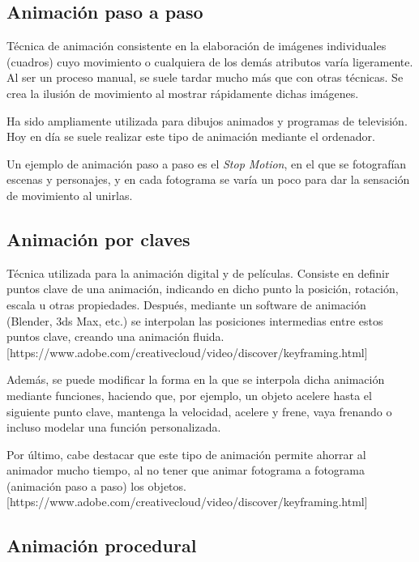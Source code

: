 \documentclass{article}
\begin{document}
\subsection{Animación paso a paso}

Técnica de animación consistente en la elaboración de imágenes individuales (cuadros) cuyo movimiento o cualquiera de los demás atributos varía ligeramente. Al ser un proceso manual, se suele tardar mucho más que con otras técnicas. Se crea la ilusión de movimiento al mostrar rápidamente dichas imágenes. 

\bigskip

Ha sido ampliamente utilizada para dibujos animados y programas de televisión. Hoy en día se suele realizar este tipo de animación mediante el ordenador. 

\bigskip

Un ejemplo de animación paso a paso es el \textit{Stop Motion}, en el que se fotografían escenas y personajes, y en cada fotograma se varía un poco para dar la sensación de movimiento al unirlas.


\subsection{Animación por claves}

Técnica utilizada para la animación digital y de películas. Consiste en definir puntos clave de una animación, indicando en dicho punto la posición, rotación, escala u otras propiedades. Después, mediante un software de animación (Blender, 3ds Max, etc.) se interpolan las posiciones intermedias entre estos puntos clave, creando una animación fluida. [https://www.adobe.com/creativecloud/video/discover/keyframing.html]

\bigskip

Además, se puede modificar la forma en la que se interpola dicha animación mediante funciones, haciendo que, por ejemplo, un objeto acelere hasta el siguiente punto clave, mantenga la velocidad, acelere y frene, vaya frenando o incluso modelar una función personalizada.

\bigskip

Por último, cabe destacar que este tipo de animación permite ahorrar al animador mucho tiempo, al no tener que animar fotograma a fotograma (animación paso a paso) los objetos. [https://www.adobe.com/creativecloud/video/discover/keyframing.html]


\subsection{Animación procedural}
\end{document}
